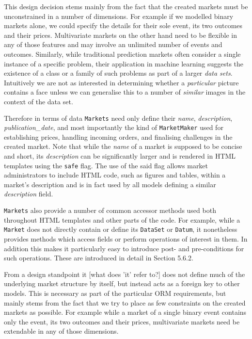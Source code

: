 \documentclass[bsc,frontabs,twoside,singlespacing,parskip,deptreport]{infthesis}     %
\begin{document}
	This design decision stems mainly from the fact that the created markets must be unconstrained in a number of dimensions. For example if we modelled binary markets alone, we could specify the details for their sole event, its two outcomes and their prices. Multivariate markets on the other hand need to be flexible in any of those features and may involve an unlimited number of events and outcomes. Similarly, while traditional prediction markets often consider a single instance of a specific problem, their application in machine learning suggests the existence of a class or a family of such problems as part of a larger {\em data sets}. Intuitively we are not as interested in determining whether a {\em particular} picture contains a face unless we can generalise this to a number of {\em similar} images in the context of the data set. 

	Therefore in terms of data {\tt Markets} need only define their {\em name}, {\em description}, {\em publication\_date}, and most importantly the kind of {\tt MarketMaker} used for establishing prices, handling incoming orders, and finalising challenges in the created market. Note that while the {\it name} of a market is supposed to be concise and short, its {\it description} can be significantly larger and is rendered in HTML templates using the {\tt safe} flag. The use of the said flag allows market administrators to include HTML code, such as figures and tables, within a market's description and is in fact used by all models defining a similar {\it description} field. 

	{\tt Markets} also provide a number of common accessor methods used both throughout HTML templates and other parts of the code. For example, while a {\tt Market} does not directly contain or define its {\tt DataSet} or {\tt Datum}, it nonetheless provides methods which access fields or perform operations of interest in them. In addition this makes it particularly easy to introduce post- and pre-conditions for such operations. These are introduced in detail in Section 5.6.2. 
    
    From a design standpoint it [what does 'it' refer to?] does not define much of the underlying market structure by itself, but instead acts as a foreign key to other models. This is necessary as part of the particular ORM requirements, but mainly stems from the fact that we try to place as few constraints on the created markets as possible. For example while a market of a single binary event contains only the event, its two outcomes and their prices, multivariate markets need be extendable in any of those dimensions. 
\end{document}
